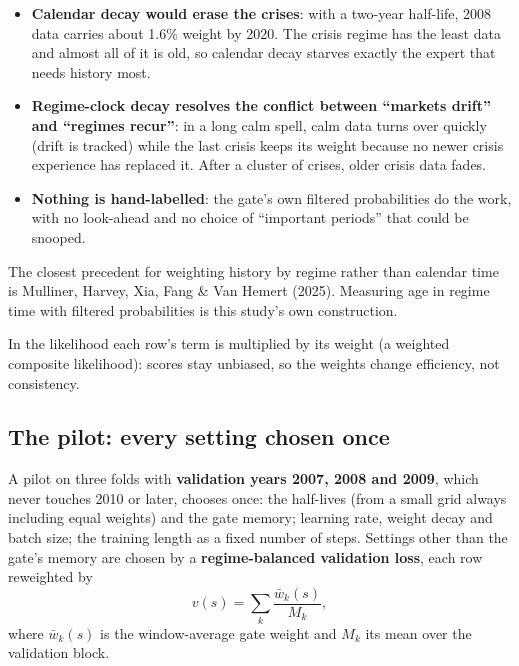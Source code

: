 \begin{whybox}
\begin{itemize}
\item \textbf{Calendar decay would erase the crises}: with a two-year half-life, 2008 data carries about 1.6\%
  weight by 2020. The crisis regime has the least data and almost all of it is old, so calendar decay
  starves exactly the expert that needs history most.
\item \textbf{Regime-clock decay resolves the conflict between ``markets drift'' and ``regimes recur''}: in a
  long calm spell, calm data turns over quickly (drift is tracked) while the last crisis keeps its weight
  because no newer crisis experience has replaced it. After a cluster of crises, older crisis data fades.
\item \textbf{Nothing is hand-labelled}: the gate's own filtered probabilities do the work, with no look-ahead
  and no choice of ``important periods'' that could be snooped.
\end{itemize}
The closest precedent for weighting history by regime rather than calendar time is Mulliner, Harvey, Xia,
Fang \& Van Hemert (2025). Measuring age in regime time with filtered probabilities is this study's own
construction.
\end{whybox}

In the likelihood each row's term is multiplied by its weight (a weighted composite likelihood): scores
stay unbiased, so the weights change efficiency, not consistency.

\subsection{The pilot: every setting chosen once}

 A pilot on three folds with \textbf{validation years 2007, 2008 and 2009}, which never touches
2010 or later, chooses once: the half-lives (from a small grid always including equal weights) and the gate
memory; learning rate, weight decay and batch size; the training length as a fixed number of steps.
Settings other than the gate's memory are chosen by a \textbf{regime-balanced validation loss}, each row
reweighted by
\begin{equation}
v(s)=\sum_{k}\frac{\bar w_k(s)}{M_k},
\end{equation}
where $\bar w_k(s)$ is the window-average gate weight and $M_k$ its mean over the validation block.

